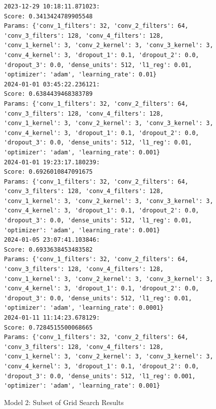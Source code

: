 \newpage

\setcounter{figure}{0}
\setcounter{table}{0} 
\begin{figure}[H]
\begin{verbatim}
2023-12-29 10:18:11.871023:
Score: 0.3413424789905548
Params: {'conv_1_filters': 32, 'conv_2_filters': 64, 'conv_3_filters': 128, 'conv_4_filters': 128, 'conv_1_kernel': 3, 'conv_2_kernel': 3, 'conv_3_kernel': 3, 'conv_4_kernel': 3, 'dropout_1': 0.1, 'dropout_2': 0.0, 'dropout_3': 0.0, 'dense_units': 512, 'l1_reg': 0.01, 'optimizer': 'adam', 'learning_rate': 0.01}
2024-01-01 03:45:22.236121:
Score: 0.6384439468383789
Params: {'conv_1_filters': 32, 'conv_2_filters': 64, 'conv_3_filters': 128, 'conv_4_filters': 128, 'conv_1_kernel': 3, 'conv_2_kernel': 3, 'conv_3_kernel': 3, 'conv_4_kernel': 3, 'dropout_1': 0.1, 'dropout_2': 0.0, 'dropout_3': 0.0, 'dense_units': 512, 'l1_reg': 0.01, 'optimizer': 'adam', 'learning_rate': 0.001}
2024-01-01 19:23:17.180239:
Score: 0.6926010847091675
Params: {'conv_1_filters': 32, 'conv_2_filters': 64, 'conv_3_filters': 128, 'conv_4_filters': 128, 'conv_1_kernel': 3, 'conv_2_kernel': 3, 'conv_3_kernel': 3, 'conv_4_kernel': 3, 'dropout_1': 0.1, 'dropout_2': 0.0, 'dropout_3': 0.0, 'dense_units': 512, 'l1_reg': 0.01, 'optimizer': 'adam', 'learning_rate': 0.001}
2024-01-05 23:07:41.103846:
Score: 0.6933638453483582
Params: {'conv_1_filters': 32, 'conv_2_filters': 64, 'conv_3_filters': 128, 'conv_4_filters': 128, 'conv_1_kernel': 3, 'conv_2_kernel': 3, 'conv_3_kernel': 3, 'conv_4_kernel': 3, 'dropout_1': 0.1, 'dropout_2': 0.0, 'dropout_3': 0.0, 'dense_units': 512, 'l1_reg': 0.01, 'optimizer': 'adam', 'learning_rate': 0.0001}
2024-01-11 11:14:23.678129:
Score: 0.7284515500068665
Params: {'conv_1_filters': 32, 'conv_2_filters': 64, 'conv_3_filters': 128, 'conv_4_filters': 128, 'conv_1_kernel': 3, 'conv_2_kernel': 3, 'conv_3_kernel': 3, 'conv_4_kernel': 3, 'dropout_1': 0.1, 'dropout_2': 0.0, 'dropout_3': 0.0, 'dense_units': 512, 'l1_reg': 0.001, 'optimizer': 'adam', 'learning_rate': 0.001}
\end{verbatim}
\caption{Model 2: Subset of Grid Search Results}
\label{fig:model-2-grid-result}
\end{figure}

\newpage

